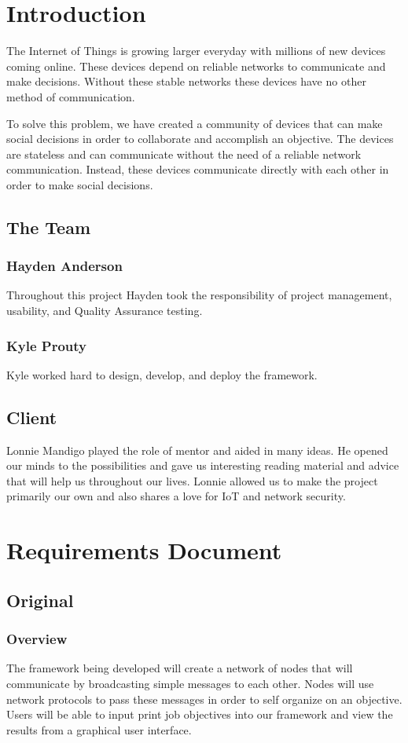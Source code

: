 \documentclass[draftclsnofoot, onecolumn, compsoc, 10pt]{IEEEtran}
\begin{document}
\section{Introduction}
The Internet of Things is growing larger everyday with millions of new devices coming online. These devices depend on reliable networks to communicate and make decisions. Without these stable networks these devices have no other method of communication.

To solve this problem, we have created a community of devices that can make social decisions in order to collaborate and accomplish an objective. The devices are stateless and can communicate without the need of a reliable network communication. Instead, these devices communicate directly with each other in order to make social decisions.
\subsection{The Team}
\subsubsection{Hayden Anderson}
Throughout this project Hayden took the responsibility of project management, 
usability, and Quality Assurance testing. 
\subsubsection{Kyle Prouty}
Kyle worked hard to design, develop, and deploy the framework. 

\subsection{Client}
Lonnie Mandigo played the role of mentor and aided in many ideas. He opened our minds to the possibilities and gave us interesting reading material and advice that will help us throughout our lives. Lonnie allowed us to make the project primarily our own and also shares a love for IoT and network security.
\section{Requirements Document}
\subsection{Original}

\subsubsection{Overview}
The framework being developed will create a network of nodes that will communicate by broadcasting simple messages to each other. Nodes will use network protocols to pass these messages in order to self organize on an objective. Users will be able to input print job objectives into our framework and view the results from a graphical user interface.
\end{document}
